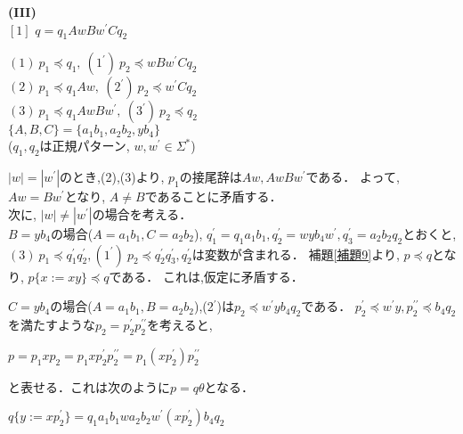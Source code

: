 
\noindent \textbf{(I\hspace{-.1em}I\hspace{-.1em}I)} \textbf{} \\
\noindent $[1]$ $q=q_{1}AwBw^{\prime}Cq_{2}$ 
\medskip

\indent$(1) \ p_{1} \preceq q_{1}, \ (1^{\prime}) \ p_{2} \preceq wBw^{\prime}Cq_{2}$ \\
\indent $(2) \ p_{1} \preceq q_{1}Aw, \ (2^{\prime}) \ p_{2} \preceq w^{\prime}Cq_{2}$ \\
\indent $(3) \ p_{1} \preceq q_{1}AwBw^{\prime}, \ (3^{\prime}) \ p_{2} \preceq q_{2}$ \\	
\indent $\{ A, B, C \} = \{ a_{1}b_{1}, a_{2}b_{2}, yb_{4} \}$ \\
\indent ($q_{1}, q_{2}$は正規パターン, $w, w^{\prime} \in \Sigma^{\ast}$) 	
\medskip

$|w|=|w^{\prime}|$のとき,(2),(3)より, $p_{1}$の接尾辞は$Aw, AwBw^{\prime}$である．
よって, $Aw=Bw^{\prime}$となり, $A \ne B$であることに矛盾する．\\
\indent 次に, $|w| \ne |w^{\prime}|$の場合を考える．\\
\indent $B=yb_{4}$の場合($A=a_{1}b_{1}, C=a_{2}b_{2}$), $q_{1}^{\prime}=q_{1}a_{1}b_{1}, q_{2}^{\prime}=wyb_{4}w^{\prime}, q_{3}^{\prime}=a_{2}b_{2}q_{2}$とおくと,$(3) \  p_{1} \preceq q_{1}^{\prime}q_{2}^{\prime}, (1^{\prime}) \ p_{2} \preceq q_{2}^{\prime}q_{3}^{\prime}, q_{2}^{\prime}$は変数が含まれる．
補題\ref{補題9}より, $p \preceq q$となり, $p \{ x := xy \} \preceq q$である．
これは,仮定に矛盾する．

$C=yb_{4}$の場合($A=a_{1}b_{1}, B=a_{2}b_{2}$),(2$^{\prime}$)は$p_{2} \preceq w^{\prime}yb_{4}q_{2}$である．
$p_{2}^{\prime} \preceq w^{\prime}y, p_{2}^{\prime\prime} \preceq b_{4}q_{2}$を満たすような$p_{2}=p_{2}^{\prime}p_{2}^{\prime\prime}$を考えると,

$p=p_{1}xp_{2}=p_{1}xp_{2}^{\prime}p_{2}^{\prime\prime}=p_{1}(xp_{2}^{\prime})p_{2}^{\prime\prime}$

\noindent と表せる．これは次のように$p=q \theta$となる．

$q \{ y := xp_{2}^{\prime} \} = q_{1}a_{1}b_{1}wa_{2}b_{2}w^{\prime}(xp_{2}^{\prime})b_{4}q_{2}$

